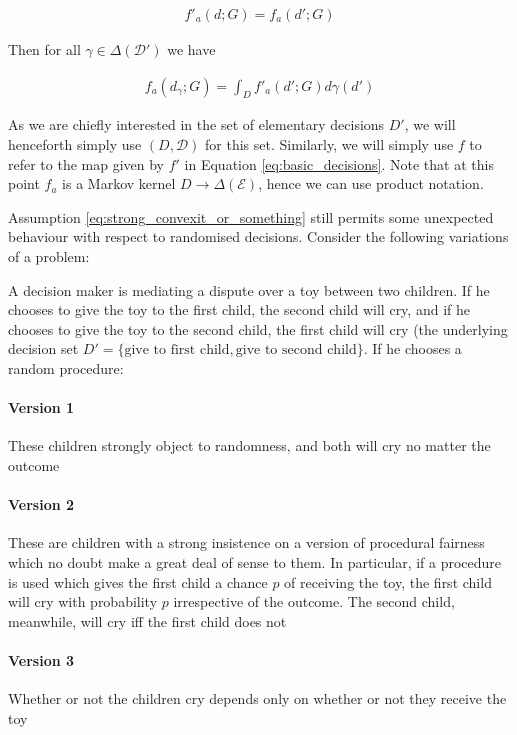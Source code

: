 \begin{align}
	f'_a(d;G) = f_a(d';G)
\end{align}

Then for all $\gamma\in \Delta(\mathcal{D}')$ we have

\begin{align}
	f_a(d_\gamma;G) = \int_D f'_a(d';G) d\gamma(d') \label{eq:basic_decisions}
\end{align}



As we are chiefly interested in the set of elementary decisions $D'$, we will henceforth simply use $(D,\mathcal{D})$ for this set. Similarly, we will simply use $f$ to refer to the map given by $f'$ in Equation \ref{eq:basic_decisions}. Note that at this point $f_a$ is a Markov kernel $D\to \Delta(\mathcal{E})$, hence we can use product notation.

Assumption \ref{eq:strong_convexit_or_something} still permits some unexpected behaviour with respect to randomised decisions. Consider the following variations of a problem:

\begin{example}
A decision maker is mediating a dispute over a toy between two children. If he chooses to give the toy to the first child, the second child will cry, and if he chooses to give the toy to the second child, the first child will cry (the underlying decision set $D'=\{\text{give to first child}, \text{give to second child}\}$. If he chooses a random procedure:

\paragraph{Version 1} These children strongly object to randomness, and both will cry no matter the outcome
\paragraph{Version 2} These are children with a strong insistence on a version of procedural fairness which no doubt make a great deal of sense to them. In particular, if a procedure is used which gives the first child a chance $p$ of receiving the toy, the first child will cry with probability $p$ irrespective of the outcome. The second child, meanwhile, will cry iff the first child does not
\paragraph{Version 3} Whether or not the children cry depends only on whether or not they receive the toy
\end{example}

